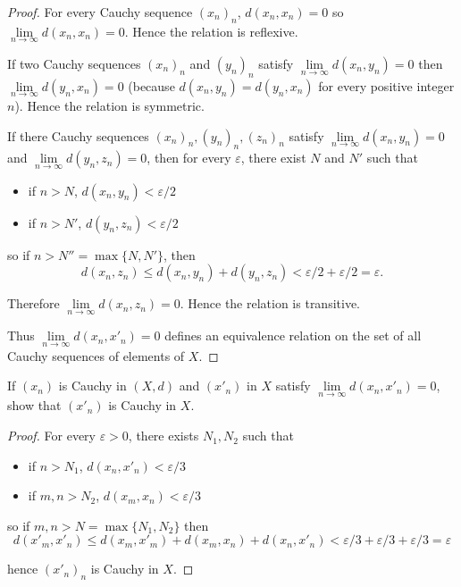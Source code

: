 \begin{proof}
    For every Cauchy sequence ${(x_{n})}_{n}$, $d(x_{n}, x_{n}) = 0$ so $\lim\limits_{n\to\infty} d(x_{n}, x_{n}) = 0$. Hence the relation is reflexive.

    If two Cauchy sequences ${(x_{n})}_{n}$ and ${(y_{n})}_{n}$ satisfy $\lim\limits_{n\to\infty}d(x_{n}, y_{n}) = 0$ then $\lim\limits_{n\to\infty}d(y_{n}, x_{n}) = 0$ (because $d(x_{n}, y_{n}) = d(y_{n}, x_{n})$ for every positive integer $n$). Hence the relation is symmetric.

    If there Cauchy sequences ${(x_{n})}_{n}, {(y_{n})}_{n}, {(z_{n})}_{n}$ satisfy $\lim\limits_{n\to\infty}d(x_{n}, y_{n}) = 0$ and $\lim\limits_{n\to\infty}d(y_{n}, z_{n}) = 0$, then for every $\varepsilon$, there exist $N$ and $N'$ such that
    \begin{itemize}
        \item if $n > N$, $d(x_{n}, y_{n}) < \varepsilon/2$
        \item if $n > N'$, $d(y_{n}, z_{n}) < \varepsilon/2$
    \end{itemize}

    so if $n > N'' = \max\{ N, N' \}$, then
    \[
        d(x_{n}, z_{n}) \leq d(x_{n}, y_{n}) + d(y_{n}, z_{n}) < \varepsilon/2 + \varepsilon/2 = \varepsilon.
    \]

    Therefore $\lim\limits_{n\to\infty}d(x_{n}, z_{n}) = 0$. Hence the relation is transitive.

    Thus $\lim\limits_{n\to\infty}d(x_{n}, x'_{n}) = 0$ defines an equivalence relation on the set of all Cauchy sequences of elements of $X$.
\end{proof}

\begin{exercise}\label{chapter1:section6:exercise12}
    If $(x_{n})$ is Cauchy in $(X, d)$ and ${(x'_{n})}$ in $X$ satisfy $\lim\limits_{n\to\infty} d(x_{n}, x'_{n}) = 0$, show that ${(x'_{n})}$ is Cauchy in $X$.
\end{exercise}

\begin{proof}
    For every $\varepsilon > 0$, there exists $N_{1}, N_{2}$ such that
    \begin{itemize}
        \item if $n > N_{1}$, $d(x_{n}, x'_{n}) < \varepsilon/3$
        \item if $m, n > N_{2}$, $d(x_{m}, x_{n}) < \varepsilon/3$
    \end{itemize}

    so if $m, n > N = \max\{ N_{1}, N_{2} \}$ then
    \[
        d(x'_{m}, x'_{n})\leq d(x_{m}, x'_{m}) + d(x_{m}, x_{n}) + d(x_{n}, x'_{n}) < \varepsilon/3 + \varepsilon/3 + \varepsilon/3 = \varepsilon
    \]

    hence ${(x'_{n})}_{n}$ is Cauchy in $X$.
\end{proof}

